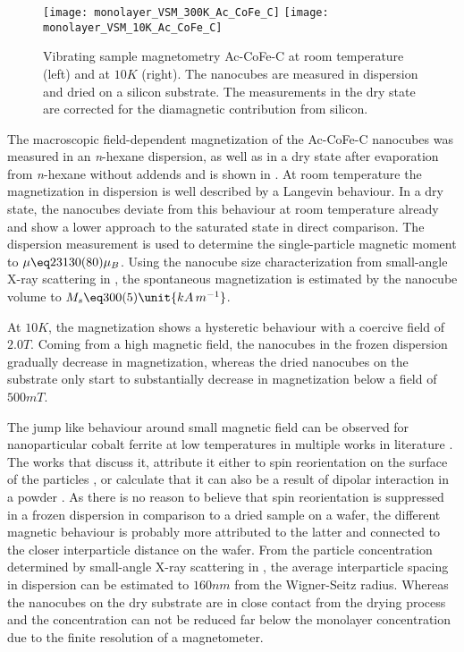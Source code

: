 \documentclass[\main/dresen_thesis.tex]{subfiles}
\begin{document}
  \label{sec:monolayers:nanoparticle:vsm}

  \begin{figure}[tb]
    \centering
    \texttt{[image: monolayer\_VSM\_300K\_Ac\_CoFe\_C]}
    \texttt{[image: monolayer\_VSM\_10K\_Ac\_CoFe\_C]}
    \caption{\label{fig:monolayers:nanoparticle:vsmAcCoFeC}Vibrating sample magnetometry Ac-CoFe-C at room temperature (left) and at $10 \unit{K}$ (right). The nanocubes are measured in dispersion and dried on a silicon substrate. The measurements in the dry state are corrected for the diamagnetic contribution from silicon.}
  \end{figure}

  The macroscopic field-dependent magnetization of the Ac-CoFe-C nanocubes was measured in an \textit{n}-hexane dispersion, as well as in a dry state after evaporation from \textit{n}-hexane without addends and is shown in .
  At room temperature the magnetization in dispersion is well described by a Langevin behaviour.
  In a dry state, the nanocubes deviate from this behaviour at room temperature already and show a lower approach to the saturated state in direct comparison.
  The dispersion measurement is used to determine the single-particle magnetic moment to $\mu \eq 23130(80) \mu_B$.
  Using the nanocube size characterization from small-angle X-ray scattering in , the spontaneous magnetization is estimated by the nanocube volume to $M_s \eq 300(5) \unit{kA\, m^{-1}}$.

  At $10 \unit{K}$, the magnetization shows a hysteretic behaviour with a coercive field of $2.0 \unit{T}$.
  Coming from a high magnetic field, the nanocubes in the frozen dispersion gradually decrease in magnetization, whereas the dried nanocubes on the substrate only start to substantially decrease in magnetization below a field of $500 \unit{mT}$.

  The jump like behaviour around small magnetic field can be observed for nanoparticular cobalt ferrite at low temperatures in multiple works in literature \cite{Xu_2015_Simul, Alves_2017_Waspw, Geng_2016_Highm, Jung_2005_CoFe2, Fu_2012_Uniqu, Tirosh_2005_Optim}.
  The works that discuss it, attribute it either to spin reorientation on the surface of the particles \cite{Xu_2015_Simul, Fu_2012_Uniqu, Geng_2016_Highm}, or calculate that it can also be a result of dipolar interaction in a powder \cite{Alves_2017_Waspw}.
  As there is no reason to believe that spin reorientation is suppressed in a frozen dispersion in comparison to a dried sample on a wafer, the different magnetic behaviour is probably more attributed to the latter and connected to the closer interparticle distance on the wafer.
  From the particle concentration determined by small-angle X-ray scattering in , the average interparticle spacing in dispersion can be estimated to $160 \unit{nm}$ from the Wigner-Seitz radius.
  Whereas the nanocubes on the dry substrate are in close contact from the drying process and the concentration can not be reduced far below the monolayer concentration due to the finite resolution of a magnetometer.
\end{document}
